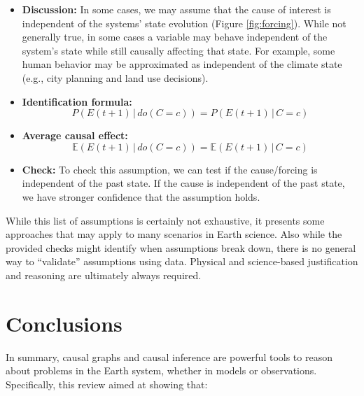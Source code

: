 \documentclass[12pt]{article}
\begin{document}
\begin{itemize}
\item \textbf{Discussion:} In some cases, we may assume that
  the cause of interest is independent of the systems' state
  evolution (Figure \ref{fig:forcing}). While not generally true,
  in some cases a variable may behave independent of the system's
  state while still causally affecting that state. For example, some
  human behavior may be approximated as independent of the climate
  state (e.g., city planning and land use decisions).
\item \textbf{Identification formula:}
  \begin{equation*}
    P(E(t+1) \, | \, do(C = c)) = P(E(t+1) \, | \, C = c)
  \end{equation*}
\item \textbf{Average causal effect:}
  \begin{equation*}
    \mathbb{E}(E(t+1) \, | \, do(C = c)) = \mathbb{E}(E(t+1) \, | \, C=c)
  \end{equation*}
\item \textbf{Check:} To check this assumption, we can test if the
  cause/forcing is independent of the past state. If the cause is
  independent of the past state, we have stronger confidence that the
  assumption holds.
\end{itemize}

While this list of assumptions is certainly not exhaustive, it
presents some approaches that may apply to many scenarios in Earth
science. Also while the provided checks might identify when
assumptions break down, there is no general way to ``validate''
assumptions using data. Physical and science-based justification and
reasoning are ultimately always required.

\section{Conclusions}

In summary, causal graphs and causal inference are powerful tools to
reason about problems in the Earth system, whether in models or observations. Specifically, this review
aimed at showing that:
\end{document}
